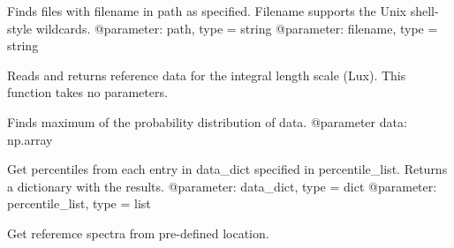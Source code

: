\documentclass[letterpaper,10pt,english]{sphinxmanual}
\begin{document}
\begin{fulllineitems}
\label{\detokenize{index:windtunnel.get_files}}
Finds files with filename in path as specified. Filename supports the
Unix shell-style wildcards.
@parameter: path, type = string
@parameter: filename, type = string

\end{fulllineitems}


\begin{fulllineitems}
\label{\detokenize{index:windtunnel.get_lux_referencedata}}
Reads and returns reference data for the integral length scale (Lux).
This function takes no parameters.

\end{fulllineitems}


\begin{fulllineitems}
\label{\detokenize{index:windtunnel.get_pdf_max}}
Finds maximum of the probability distribution of data.
@parameter data: np.array

\end{fulllineitems}


\begin{fulllineitems}
\label{\detokenize{index:windtunnel.get_percentiles}}
Get percentiles from each entry in data\_dict specified in
percentile\_list. Returns a dictionary with the results.
@parameter: data\_dict, type = dict
@parameter: percentile\_list, type = list

\end{fulllineitems}


\begin{fulllineitems}
\label{\detokenize{index:windtunnel.get_reference_spectra}}
Get referemce spectra from pre-defined location.

\end{fulllineitems}
\end{document}
